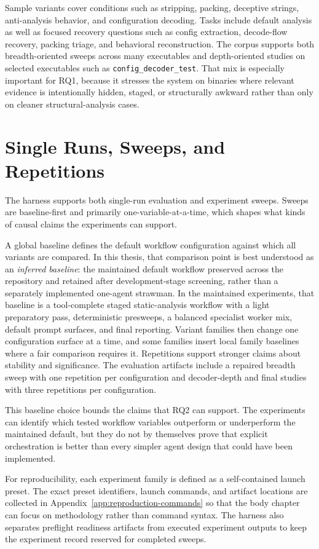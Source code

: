Sample variants cover conditions such as stripping, packing, deceptive strings, anti-analysis behavior, and configuration decoding. Tasks include default analysis as well as focused recovery questions such as config extraction, decode-flow recovery, packing triage, and behavioral reconstruction. The corpus supports both breadth-oriented sweeps across many executables and depth-oriented studies on selected executables such as \texttt{config\_decoder\_test}. That mix is especially important for RQ1, because it stresses the system on binaries where relevant evidence is intentionally hidden, staged, or structurally awkward rather than only on cleaner structural-analysis cases.

\section{Single Runs, Sweeps, and Repetitions}

The harness supports both single-run evaluation and experiment sweeps. Sweeps are baseline-first and primarily one-variable-at-a-time, which shapes what kinds of causal claims the experiments can support.

A global baseline defines the default workflow configuration against which all variants are compared. In this thesis, that comparison point is best understood as an \emph{inferred baseline}: the maintained default workflow preserved across the repository and retained after development-stage screening, rather than a separately implemented one-agent strawman. In the maintained experiments, that baseline is a tool-complete staged static-analysis workflow with a light preparatory pass, deterministic presweeps, a balanced specialist worker mix, default prompt surfaces, and final reporting. Variant families then change one configuration surface at a time, and some families insert local family baselines where a fair comparison requires it. Repetitions support stronger claims about stability and significance. The evaluation artifacts include a repaired breadth sweep with one repetition per configuration and decoder-depth and final studies with three repetitions per configuration.

This baseline choice bounds the claims that RQ2 can support. The experiments can identify which tested workflow variables outperform or underperform the maintained default, but they do not by themselves prove that explicit orchestration is better than every simpler agent design that could have been implemented.

For reproducibility, each experiment family is defined as a self-contained launch preset. The exact preset identifiers, launch commands, and artifact locations are collected in Appendix~\ref{app:reproduction-commands} so that the body chapter can focus on methodology rather than command syntax. The harness also separates preflight readiness artifacts from executed experiment outputs to keep the experiment record reserved for completed sweeps.

